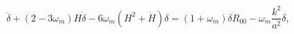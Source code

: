 \begin{equation}
\ddot \delta+ (2-3\omega_m)H\dot \delta -6\omega_m(H^2+\dot H)
\delta=(1+\omega_m)\delta R_{00}-\omega_m \frac{k^2}{a^2}\delta,
\end{equation}

